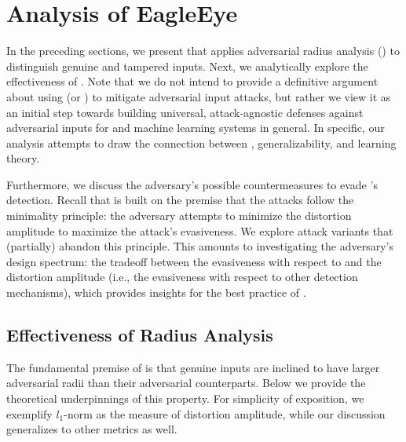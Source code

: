 \section{Analysis of EagleEye}
\label{sec:analysis}

In the preceding sections, we present \system that applies adversarial radius analysis (\mar) to distinguish genuine and tampered inputs. Next, we analytically explore the effectiveness of \mar. Note that we do not intend to provide a definitive argument about using \system (or \mar) to mitigate adversarial input attacks, but rather we view it as an initial step towards building universal, attack-agnostic defenses against adversarial inputs for \dl and machine learning systems in general. In specific, our analysis attempts to draw the connection between \mar, \dnn generalizability, and learning theory.


Furthermore, we discuss the adversary's possible countermeasures to evade \system's detection. Recall that \system is built on the premise that the attacks follow the minimality principle: the adversary attempts to minimize the distortion amplitude to maximize the attack's evasiveness. We explore attack variants that (partially) abandon this principle. This amounts to investigating the adversary's design spectrum: the tradeoff between the evasiveness with respect to \system and the distortion amplitude (i.e., the evasiveness with respect to other detection mechanisms), which provides insights for the best practice of \system.




\subsection{Effectiveness of Radius Analysis}
\label{sec:mara}

The fundamental premise of \mar is that genuine inputs are inclined to have larger adversarial radii than their adversarial counterparts. Below we provide the theoretical underpinnings of this property. For simplicity of exposition, we exemplify $l_1$-norm as the measure of distortion amplitude, while our discussion generalizes to other metrics as well.

